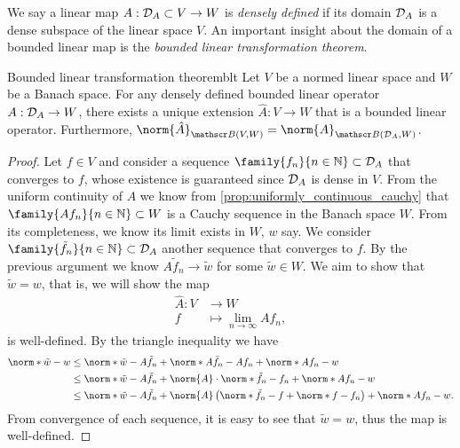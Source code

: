 We say a linear map \(A : \mathcal{D}_{A} \subset V \to W\) is \emph{densely defined} if its domain \(\mathcal{D}_{A}\) is a dense subspace of the linear space \(V\). An important insight about the domain of a bounded linear map is the \emph{bounded linear transformation theorem}.
\begin{theorem}{Bounded linear transformation theorem}{blt}
    Let \(V\) be a normed linear space and \(W\) be a Banach space. For any densely defined bounded linear operator \(A : \mathcal{D}_{A} \to W\), there exists a unique extension \(\hat{A} : V \to W\) that is a bounded linear operator. Furthermore, \(\norm{\hat{A}}_{\bounded(V,W)} = \norm{A}_{\bounded(\domain{A}, W)}\).
\end{theorem}
\begin{proof}
    Let \(f \in V\) and consider a sequence \(\family{f_n}{n\in \mathbb{N}}\subset \domain{A}\) that converges to \(f\), whose existence is guaranteed since \(\mathcal{D}_{A}\) is dense in \(V\). From the uniform continuity of \(A\) we know from \cref{prop:uniformly_continuous_cauchy} that \(\family{Af_n}{n\in \mathbb{N}} \subset W\) is a Cauchy sequence in the Banach space \(W\). From its completeness, we know its limit exists in \(W\), \(w\) say. We consider \(\family{\tilde{f}_n}{n\in \mathbb{N}}\subset \domain{A}\) another sequence that converges to \(f\). By the previous argument we know \(A\tilde{f}_n \to \tilde{w}\) for some \(\tilde{w} \in W\). We aim to show that \(\tilde{w} = w\), that is, we will show the map
    \begin{align*}
        \hat{A} : V &\to W\\
                  f &\mapsto \lim_{n\to \infty} Af_n,
    \end{align*}
    is well-defined. By the triangle inequality we have
    \begin{align*}
        \norm*{\tilde{w} - w} &\leq \norm*{\tilde{w} - A\tilde{f}_n} + \norm*{A\tilde{f}_n - Af_n}  + \norm*{Af_n - w}\\
                              &\leq \norm*{\tilde{w} - A\tilde{f}_n} + \norm{A}\cdot\norm*{\tilde{f}_n - f_n}  + \norm*{Af_n - w}\\
                              &\leq \norm*{\tilde{w} - A\tilde{f}_n} + \norm{A}\left(\norm*{\tilde{f}_n - f} + \norm*{f - f_n}\right)  + \norm*{Af_n - w}.
    \end{align*}
    From convergence of each sequence, it is easy to see that \(\tilde{w} = w\), thus the map is well-defined.


\end{proof}
